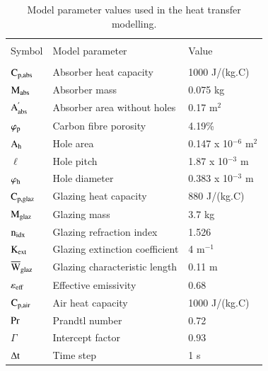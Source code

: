 
\begin{table}[!ht]
	\caption{Model parameter values used in the heat transfer modelling.}
	\centering
\begin{tabular}{p{2cm}p{6cm}p{3.5cm}}
	\hline \\[-10pt]
	Symbol & Model parameter & Value \\ [2pt]
	 \hline \\[-12pt]
	$\rm{C_{p,abs}}$ & Absorber heat capacity & 1000 J/(kg.\textdegree C) \\ [2pt]
	
	$\rm{M_{abs}}$ & Absorber mass & 0.075 kg \\ [2pt]
	
	$\rm{A_{abs}^{'}}$ & Absorber area without holes & 0.17 m$^2$ \\ [2pt]
	
	$\varphi_{\rm{p}}$ & Carbon fibre porosity & 4.19\% \\ [2pt]
	
	$\rm{A_h}$ & Hole area & 0.147 x 10$^{-6}$ m$^2$ \\ [2pt]
	
	$\ell$ & Hole pitch & 1.87 x 10$^{-3}$ m \\ [2pt]
	
	$\varphi_{\rm{h}}$ & Hole diameter & 0.383 x 10$^{-3}$ m \\ [2pt]
 
	$\rm{C_{p,glaz}}$ & Glazing heat capacity & 880 J/(kg.\textdegree C) \\ [2pt]
 
	$\rm{M_{glaz}}$ & Glazing mass & 3.7 kg \\ [2pt]
	
    $\rm{n_{idx}}$ & Glazing refraction index & 1.526 \\ [2pt]
 
	$\rm{K_{ext}}$ & Glazing extinction coefficient & 4 m$^{-1}$ \\ [2pt]
	
	$\rm{{\overline W}_{glaz}}$ & Glazing characteristic length & 0.11 m \\ [2pt]
	

	$\varepsilon_{\rm{eff}}$ & Effective emissivity & 0.68 \\ [2pt]

	$\rm{C_{p,air}}$ & Air heat capacity & 1000 J/(kg.\textdegree C) \\ [2pt]
 
	$\rm{Pr}$ & Prandtl number & 0.72 \\ [2pt]

	$\Gamma$ & Intercept factor & 0.93 \\ [2pt]
 
	$\Delta {\rm{t}}$ & Time step & 1 s \\ 
	\hline 
\end{tabular}
	\label{model_parameters}
\end{table}

